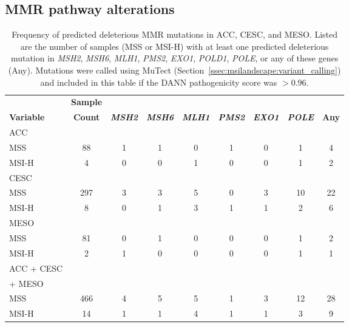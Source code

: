 \subsection{MMR pathway alterations}
\begin{table}[htbp]
    \centering
    {\small
    \begin{tabular}{lc:cccccc:c}
        & \textbf{Sample} & & & & & & \\
        \textbf{Variable} & \textbf{Count} & \textbf{\textit{MSH2}} & \textbf{\textit{MSH6}} & \textbf{\textit{MLH1}} & \textbf{\textit{PMS2}} & \textbf{\textit{EXO1}} & \textbf{\textit{POLE}} & \textbf{Any} \\
        \hline
        ACC & & & & & & & & \\
        \hphantom{---} MSS   & 88 & 1 & 1 & 0 & 1 & 0 & 1 & 4 \\
        \hphantom{---} MSI-H & 4 & 0 & 0 & 1 & 0 & 0 & 1 & 2 \\
        \hline
        CESC & & & & & & & & \\
        \hphantom{---} MSS   & 297 & 3 & 3 & 5 & 0 & 3 & 10 & 22 \\
        \hphantom{---} MSI-H & 8 & 0 & 1 & 3 & 1 & 1 & 2 & 6 \\
        \hline
        MESO & & & & & & & & \\
        \hphantom{---} MSS   & 81 & 0 & 1 & 0 & 0 & 0 & 1 & 2 \\
        \hphantom{---} MSI-H & 2 & 1 & 0 & 0 & 0 & 0 & 1 & 1 \\
        \hline
        ACC + CESC & & & & & & & & \\
        \hphantom{ACC }+ MESO & & & & & & & & \\
        \hphantom{---} MSS   & 466 & 4 & 5 & 5 & 1 & 3 & 12 & 28 \\
        \hphantom{---} MSI-H & 14 & 1 & 1 & 4 & 1 & 1 & 3 & 9
    \end{tabular}}
    \caption[Frequency of predicted deleterious MMR mutations in ACC, CESC, and MESO.]{Frequency of predicted deleterious MMR mutations in ACC, CESC, and MESO\@. Listed are the number of samples (MSS or MSI-H) with at least one predicted deleterious mutation in \textit{MSH2}, \textit{MSH6}, \textit{MLH1}, \textit{PMS2}, \textit{EXO1}, \textit{POLD1}, \textit{POLE}, or any of these genes (Any). Mutations were called using MuTect (Section~\ref{ssec:msilandscape:variant_calling}) and included in this table if the DANN pathogenicity score was $>0.96$.}
    \label{table:msilandscape:mmr_muts}
\end{table}

